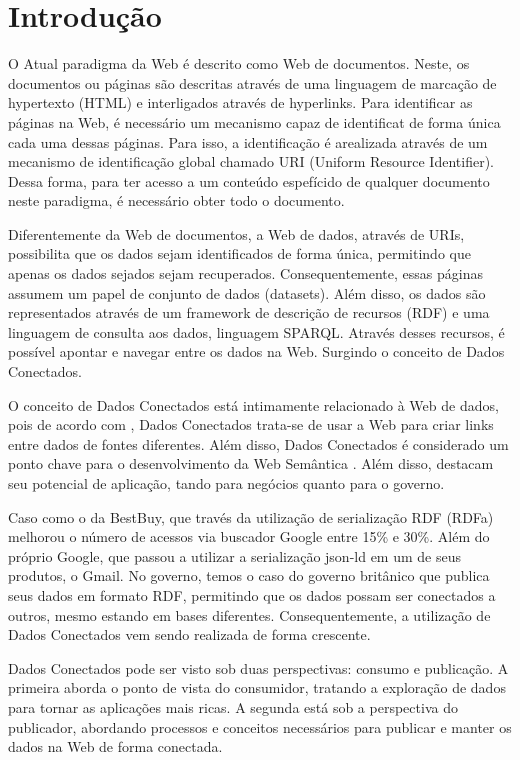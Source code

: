 \chapter{Introdução}
\label{cap:introducao}
O Atual paradigma da Web é descrito como Web de documentos. Neste, os documentos ou páginas são descritas através de uma linguagem de marcação de hypertexto (HTML) e interligados através de hyperlinks. Para identificar as páginas na Web, é necessário um mecanismo capaz de identificat de forma única cada uma dessas páginas. Para isso, a identificação é arealizada através de um mecanismo de identificação global chamado URI (Uniform Resource Identifier). Dessa forma, para ter acesso a um conteúdo espefícido de qualquer documento neste paradigma, é necessário obter todo o documento.

Diferentemente da Web de documentos, a Web de dados, através de URIs, possibilita que os dados sejam identificados de forma única, permitindo que apenas os dados sejados sejam recuperados.  Consequentemente, essas páginas assumem um papel de conjunto de dados (datasets). Além disso, os dados são representados através de um framework de descrição de recursos (RDF) e uma linguagem de consulta aos dados, linguagem SPARQL. Através desses recursos, é possível apontar e navegar entre os dados na Web. Surgindo o conceito de Dados Conectados.

O conceito de Dados Conectados está intimamente relacionado à Web de dados, pois de acordo com , Dados Conectados trata-se de usar a Web para criar links entre dados de fontes diferentes. Além disso, Dados Conectados é considerado um ponto chave para o desenvolvimento da Web Semântica \cite{berners2001semantic} . Além disso,  destacam seu potencial de aplicação, tando para negócios quanto para o governo.  

Caso como o da BestBuy, que través da utilização de serialização RDF (RDFa) melhorou o número de acessos via buscador  Google entre 15\% e 30\%. Além do próprio Google, que passou a utilizar a serialização json-ld em um de seus produtos, o Gmail. No governo, temos o caso do governo britânico que publica seus dados em formato RDF, permitindo que os dados possam ser conectados a outros, mesmo estando em bases diferentes. Consequentemente, a utilização de Dados Conectados vem sendo realizada de forma crescente.

Dados Conectados pode ser visto sob duas perspectivas: consumo e publicação. A primeira aborda o ponto de vista do consumidor, tratando a exploração de dados para tornar as aplicações mais ricas. A segunda está sob a perspectiva do publicador, abordando processos \cite{bizer2007publish, hyland2011joy, villazon2011methodological, Avila2015} e conceitos \cite{berners2006linked, wood2014linked} necessários para publicar e manter os dados na Web de forma conectada. 

